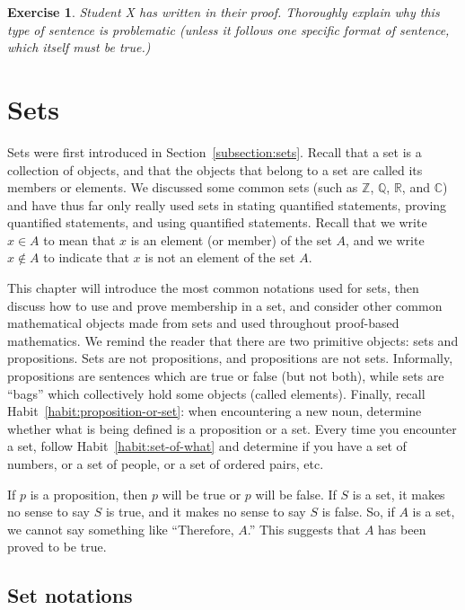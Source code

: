 \documentclass{book}
\newcounter{ekcounter}%
\theoremstyle{ekimcustom}
\newtheorem{exercise}[ekcounter]{Exercise}
\begin{document}
\begin{exercise}
Student X has written  in their proof. Thoroughly explain why this type of sentence is problematic (unless it follows one specific format of sentence, which itself must be true.) %
\end{exercise}

\chapter{Sets}\label{chapter:sets}

Sets were first introduced in Section~\ref{subsection:sets}. Recall that a set is a collection of objects, and that the objects that belong to a set are called its members or elements. We discussed some common sets (such as $\mathbb{Z}$, $\mathbb{Q}$, $\mathbb{R}$, and $\mathbb{C}$) and have thus far only really used sets in stating quantified statements, proving quantified statements, and using quantified statements. Recall that we write $x \in A$ to mean that $x$ is an element (or member) of the set $A$, and we write $x \not\in A$ to indicate that $x$ is not an element of the set $A$.

This chapter will introduce the most common notations used for sets, then discuss how to use and prove membership in a set, and consider other common mathematical objects made from sets and used throughout proof-based mathematics. We remind the reader that there are two primitive objects: sets and propositions. Sets are not propositions, and propositions are not sets. Informally, propositions are sentences which are true or false (but not both), while sets are ``bags'' which collectively hold some objects (called elements). Finally, recall Habit~\ref{habit:proposition-or-set}: when encountering a new noun, determine whether what is being defined is a proposition or a set. Every time you encounter a set, follow Habit~\ref{habit:set-of-what} and determine if you have a set of numbers, or a set of people, or a set of ordered pairs, etc.

If $p$ is a proposition, then $p$ will be true or $p$ will be false. If $S$ is a set, it makes no sense to say $S$ is true, and it makes no sense to say $S$ is false. So, if $A$ is a set, we cannot say something like ``Therefore, $A$.'' This suggests that $A$ has been proved to be true.

\section{Set notations}\label{section:set-notations}
\end{document}
